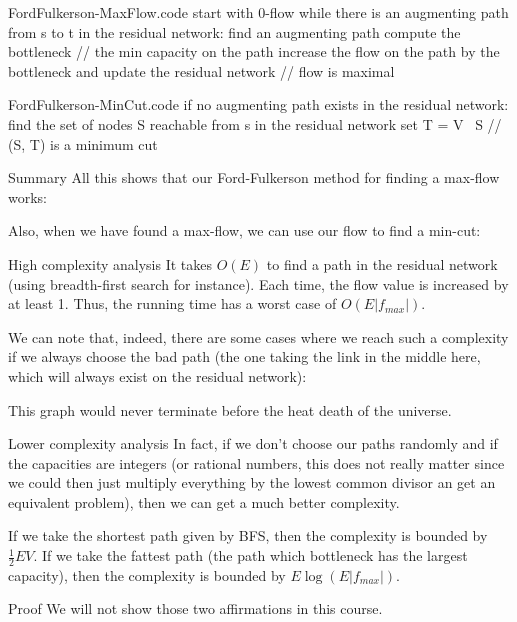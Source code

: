 \documentclass[a4paper]{article}
\begin{document}
\begin{filecontents*}[overwrite]{FordFulkerson-MaxFlow.code}
start with 0-flow
while there is an augmenting path from s to t in the residual network:
    find an augmenting path
    compute the bottleneck // the min capacity on the path
    increase the flow on the path by the bottleneck and update the residual network
// flow is maximal
\end{filecontents*}

\begin{filecontents*}[overwrite]{FordFulkerson-MinCut.code}
if no augmenting path exists in the residual network:
    find the set of nodes S reachable from s in the residual network
    set T = V \ S
    // (S, T) is a minimum cut
\end{filecontents*}


\begin{parag}{Summary}
    All this shows that our Ford-Fulkerson method for finding a max-flow works:

    Also, when we have found a max-flow, we can use our flow to find a min-cut:
\end{parag}


\begin{parag}{High complexity analysis}
    It takes $O\left(E\right)$ to find a path in the residual network (using breadth-first search for instance). Each time, the flow value is increased by at least 1. Thus, the running time has a worst case of $O\left(E \left|f_{max}\right|\right)$.

    We can note that, indeed, there are some cases where we reach such a complexity if we always choose the bad path (the one taking the link in the middle here, which will always exist on the residual network):
    
    This graph would never terminate before the heat death of the universe.
\end{parag}

\begin{parag}{Lower complexity analysis}
    In fact, if we don't choose our paths randomly and if the capacities are integers (or rational numbers, this does not really matter since we could then just multiply everything by the lowest common divisor an get an equivalent problem), then we can get a much better complexity. 

    If we take the shortest path given by BFS, then the complexity is bounded by $\frac{1}{2} E V$. If we take the fattest path (the path which bottleneck has the largest capacity), then the complexity is bounded by $E \log\left(E \left|f_{max}\right|\right)$.

    \begin{subparag}{Proof}
        We will not show those two affirmations in this course.
    \end{subparag}
\end{parag}
\end{document}
